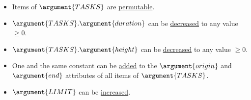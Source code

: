 \begin{ctrdesc}
{\begin{minipage}[t]{11.2cm}
\end{minipage}}
\item[\pdfmarkup{subject={Symmetries},color=white,markup=Highlight}{Symmetries}{List of mappings (e.g., permutation of arguments, permutation of items, permutation of attributes, permutation of values, translation of attributes) that preserve the solutions of the constraint.}]
\colorbox{MyAzurelight}{\begin{minipage}[t]{11.2cm}
\begin{itemize}
\item
Items of $\argument{TASKS}$ are \hyperlink{AS_items}{permutable}.
\item
$\argument{TASKS}.\argument{duration}$ can be \hyperlink{AS_vals}{decreased} to any value $\geq 0$.
\item
$\argument{TASKS}.\argument{height}$ can be \hyperlink{AS_vals}{decreased} to any value $\geq 0$.
\item
One and the same constant can be \hyperlink{AS_translate}{added} to the $\argument{origin}$ and $\argument{end}$ attributes of all items of $\argument{TASKS}$.
\item
$\argument{LIMIT}$ can be \hyperlink{AS_vals}{increased}.
\end{itemize}


\end{minipage}}
\end{ctrdesc}
